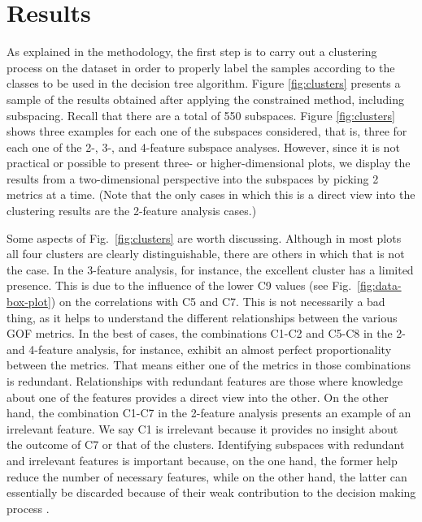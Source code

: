 
\section{Results}
\label{sec:results}

As explained in the methodology, the first step is to carry out a clustering process on the dataset in order to properly label the samples according to the classes to be used in the decision tree algorithm. Figure \ref{fig:clusters} presents a sample of the results obtained after applying the constrained \kmeans{} method, including subspacing. Recall that there are a total of 550 subspaces. Figure \ref{fig:clusters} shows three examples for each one of the subspaces considered, that is, three for each one of the 2-, 3-, and 4-feature subspace analyses. However, since it is not practical or possible to present three- or higher-dimensional plots, we display the results from a two-dimensional perspective into the subspaces by picking 2 metrics at a time. (Note that the only cases in which this is a direct view into the clustering results are the 2-feature analysis cases.)

Some aspects of Fig.~\ref{fig:clusters} are worth discussing. Although in most plots all four clusters are clearly distinguishable, there are others in which that is not the case. In 
the 3-feature analysis, for instance, the excellent cluster has a limited presence. This is due to the influence of the lower C9 values (see Fig.~\ref{fig:data-box-plot}) on the correlations with C5 and C7. This is not necessarily a bad thing, as it helps to understand the different relationships between the various GOF metrics. In the best of cases, the combinations C1-C2 and C5-C8 in the 2- and 4-feature analysis, for instance, exhibit an almost perfect proportionality between the metrics. That means either one of the metrics in those combinations is redundant. Relationships with redundant features are those where knowledge about one of the features provides a direct view into the other. On the other hand, the combination C1-C7 in the 2-feature analysis presents an example of an irrelevant feature. We say C1 is irrelevant because it provides no insight about the outcome of C7 or that of the clusters. Identifying subspaces with redundant and irrelevant features is important because, on the one hand, the former help reduce the number of necessary features, while on the other hand, the latter can essentially be discarded because of their weak contribution to the decision making process \citep{Dy_2004_MLR}.

